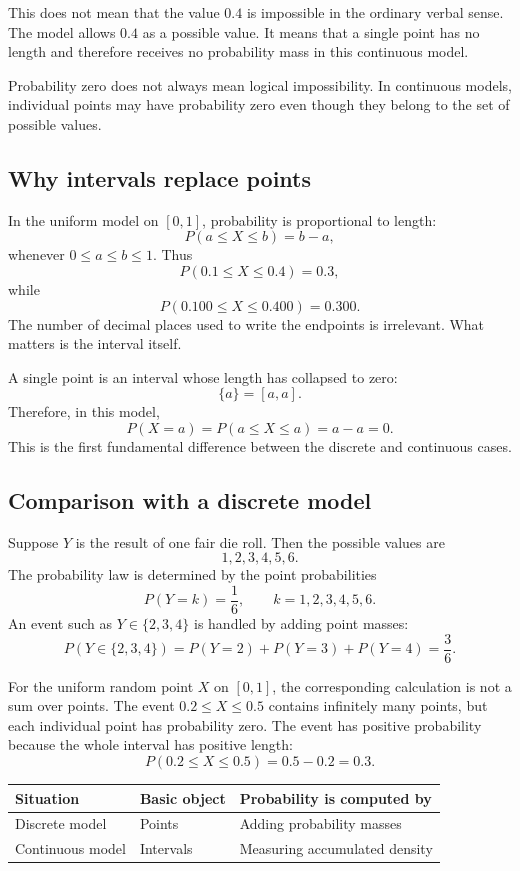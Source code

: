 This does not mean that the value \(0.4\) is impossible in the ordinary verbal
sense. The model allows \(0.4\) as a possible value. It means that a single point
has no length and therefore receives no probability mass in this continuous
model.

\begin{remarkbox}
Probability zero does not always mean logical impossibility. In continuous
models, individual points may have probability zero even though they belong to
the set of possible values.
\end{remarkbox}

\subsection*{Why intervals replace points}

In the uniform model on \([0,1]\), probability is proportional to length:
\[
P(a\leq X\leq b)=b-a,
\]
whenever \(0\leq a\leq b\leq 1\). Thus
\[
P(0.1\leq X\leq 0.4)=0.3,
\]
while
\[
P(0.100\leq X\leq 0.400)=0.300.
\]
The number of decimal places used to write the endpoints is irrelevant. What
matters is the interval itself.

A single point is an interval whose length has collapsed to zero:
\[
\{a\}=[a,a].
\]
Therefore, in this model,
\[
P(X=a)=P(a\leq X\leq a)=a-a=0.
\]
This is the first fundamental difference between the discrete and continuous
cases.

\subsection*{Comparison with a discrete model}

Suppose \(Y\) is the result of one fair die roll. Then the possible values are
\[
1,2,3,4,5,6.
\]
The probability law is determined by the point probabilities
\[
P(Y=k)=\frac16,\qquad k=1,2,3,4,5,6.
\]
An event such as \(Y\in\{2,3,4\}\) is handled by adding point masses:
\[
P(Y\in\{2,3,4\})=P(Y=2)+P(Y=3)+P(Y=4)=\frac36.
\]

For the uniform random point \(X\) on \([0,1]\), the corresponding calculation is
not a sum over points. The event \(0.2\leq X\leq 0.5\) contains infinitely many
points, but each individual point has probability zero. The event has positive
probability because the whole interval has positive length:
\[
P(0.2\leq X\leq 0.5)=0.5-0.2=0.3.
\]

\begin{center}
\begin{tabular}{lll}
\toprule
Situation & Basic object & Probability is computed by \\
\midrule
Discrete model & Points & Adding probability masses \\
Continuous model & Intervals & Measuring accumulated density \\
\bottomrule
\end{tabular}
\end{center}

